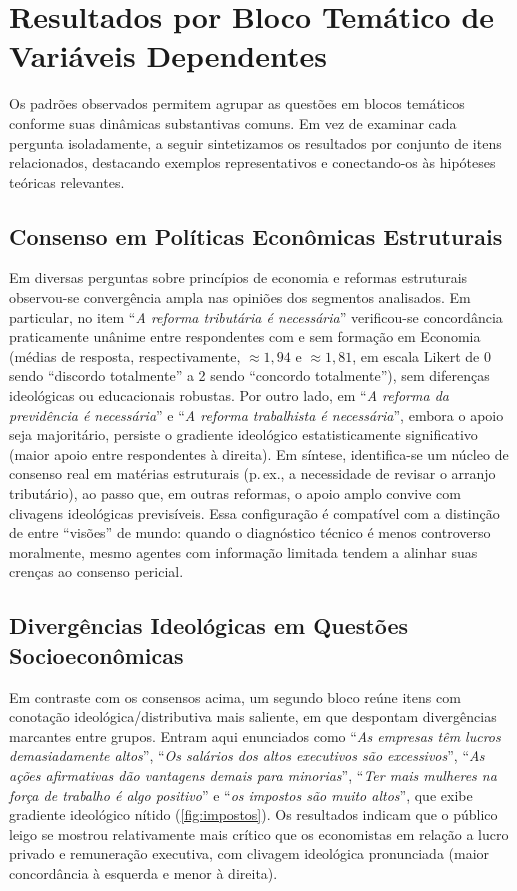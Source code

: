 \section{Resultados por Bloco Temático de Variáveis Dependentes}
Os padrões observados permitem agrupar as questões em blocos temáticos conforme suas dinâmicas substantivas comuns. Em vez de examinar cada pergunta isoladamente, a seguir sintetizamos os resultados por conjunto de itens relacionados, destacando exemplos representativos e conectando-os às hipóteses teóricas relevantes.

\subsection{Consenso em Políticas Econômicas Estruturais}
Em diversas perguntas sobre princípios de economia e reformas estruturais observou-se convergência ampla nas opiniões dos segmentos analisados. Em particular, no item ``\textit{A reforma tributária é necessária}'' verificou-se concordância praticamente unânime entre respondentes com e sem formação em Economia (médias de resposta, respectivamente, $\approx1{,}94$ e $\approx1{,}81$, em escala Likert de 0 sendo ``discordo totalmente'' a 2 sendo ``concordo totalmente''), sem diferenças ideológicas ou educacionais robustas. Por outro lado, em ``\textit{A reforma da previdência é necessária}'' e ``\textit{A reforma trabalhista é necessária}'', embora o apoio seja majoritário, persiste o gradiente ideológico estatisticamente significativo (maior apoio entre respondentes à direita). Em síntese, identifica-se um núcleo de consenso real em matérias estruturais (p.\,ex., a necessidade de revisar o arranjo tributário), ao passo que, em outras reformas, o apoio amplo convive com clivagens ideológicas previsíveis. Essa configuração é compatível com a distinção de \cite{sowell2007conflict} entre ``visões'' de mundo: quando o diagnóstico técnico é menos controverso moralmente, mesmo agentes com informação limitada tendem a alinhar suas crenças ao consenso pericial.

\subsection{Divergências Ideológicas em Questões Socioeconômicas}
Em contraste com os consensos acima, um segundo bloco reúne itens com conotação ideológica/distributiva mais saliente, em que despontam divergências marcantes entre grupos. Entram aqui enunciados como ``\textit{As empresas têm lucros demasiadamente altos}'', ``\textit{Os salários dos altos executivos são excessivos}'', ``\textit{As ações afirmativas dão vantagens demais para minorias}'', ``\textit{Ter mais mulheres na força de trabalho é algo positivo}'' e “\textit{os impostos são muito altos}”, que exibe gradiente ideológico nítido (\autoref{fig:impostos}). Os resultados indicam que o público leigo se mostrou relativamente mais crítico que os economistas em relação a lucro privado e remuneração executiva, com clivagem ideológica pronunciada (maior concordância à esquerda e menor à direita). 

